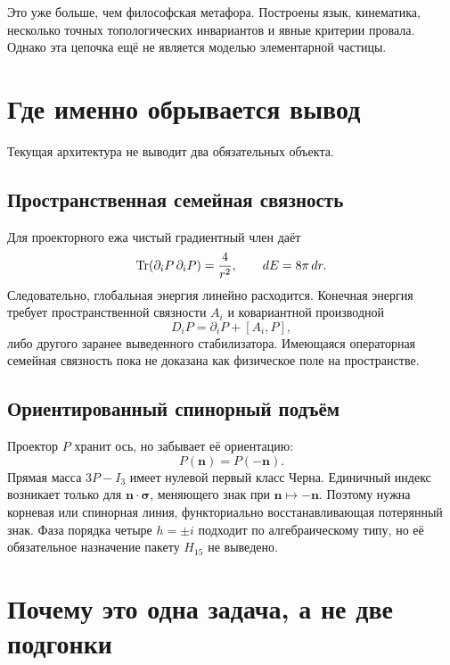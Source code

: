 Это уже больше, чем философская метафора. Построены язык, кинематика,
несколько точных топологических инвариантов и явные критерии провала.
Однако эта цепочка ещё не является моделью элементарной частицы.

\section{Где именно обрывается вывод}

Текущая архитектура не выводит два обязательных объекта.

\subsection{Пространственная семейная связность}

Для проекторного ежа чистый градиентный член даёт
\begin{equation}
 \operatorname{Tr}(\partial_iP\,\partial_iP)=\frac4{r^2},
 \qquad dE=8\pi\,dr.
\end{equation}
Следовательно, глобальная энергия линейно расходится. Конечная энергия
требует пространственной связности $A_i$ и ковариантной производной
\begin{equation}
 D_iP=\partial_iP+[A_i,P],
 \label{eq:v5-part-conclusion-covariant-projector}
\end{equation}
либо другого заранее выведенного стабилизатора. Имеющаяся операторная
семейная связность пока не доказана как физическое поле на пространстве.

\subsection{Ориентированный спинорный подъём}

Проектор $P$ хранит ось, но забывает её ориентацию:
\begin{equation}
 P(\mathbf n)=P(-\mathbf n).
\end{equation}
Прямая масса $3P-I_3$ имеет нулевой первый класс Черна. Единичный индекс
возникает только для $\mathbf n\cdot\boldsymbol\sigma$, меняющего знак при
$\mathbf n\mapsto-\mathbf n$. Поэтому нужна корневая или спинорная линия,
функториально восстанавливающая потерянный знак. Фаза порядка четыре
$h=\pm i$ подходит по алгебраическому типу, но её обязательное назначение
пакету $H_{15}$ не выведено.

\section{Почему это одна задача, а не две подгонки}

